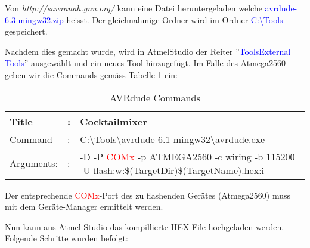 Von \textit{http://savannah.gnu.org/} kann eine Datei heruntergeladen welche \textcolor{blue}{avrdude-6.3-mingw32.zip} heisst. Der gleichnahmige Ordner wird im Ordner \textcolor{blue}{C:\textbackslash Tools} gespeichert. \cite{savannahgnuorg_index_2016}

Nachdem dies gemacht wurde, wird in AtmelStudio der Reiter ''\textcolor{blue}{Tools\textrightarrow External Tools}'' ausgewählt und ein neues Tool hinzugefügt. Im Falle des Atmega2560 geben wir die Commands gemäss Tabelle \ref{tab:AVRdude_commands} ein:

\begin{table}[h!]
\center
\begin{tabularx}{\textwidth}{|l|l|X|}
\hline
Title & : & Cocktailmixer \\
\hline
Command & : & C:\textbackslash Tools\textbackslash avrdude-6.1-mingw32\textbackslash avrdude.exe \\
\hline
Arguments: & : & -D -P \textcolor{red}{ COMx} -p ATMEGA2560 -c wiring -b 115200 -U flash:w:\$(TargetDir)\$(TargetName).hex:i\\
\hline
\end{tabularx}
\caption{AVRdude Commands}
\label{tab:AVRdude_commands}
\end{table}

Der entsprechende \textcolor{red}{ COMx}-Port des zu flashenden Gerätes (Atmega2560) muss mit dem Geräte-Manager ermittelt werden.


Nun kann aus Atmel Studio das kompillierte HEX-File hochgeladen werden.
\newpage
Folgende Schritte wurden befolgt:

